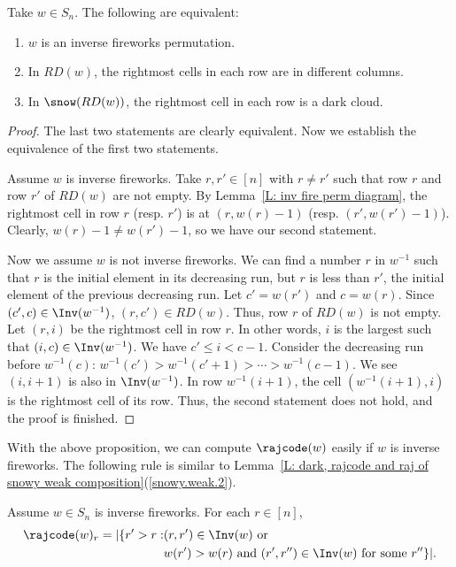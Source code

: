 \begin{prop}
Take $w \in S_n$.
The following are equivalent:
\begin{enumerate}
\item $w$ is an inverse fireworks permutation.
\item In $RD(w)$, the rightmost cells in each row 
are in different columns. 
\item In $\snow(RD(w))$, 
the rightmost cell in each row is a dark cloud. 
\end{enumerate}
\end{prop}
\begin{proof}
The last two statements are clearly equivalent. 
Now we establish the equivalence of 
the first two statements.

Assume $w$ is inverse fireworks.
Take $r, r' \in [n]$ with $r \neq r'$
such that row $r$ and row $r'$ of $RD(w)$
are not empty.
By Lemma~\ref{L: inv fire perm diagram},
the rightmost cell in row $r$ 
(resp. $r'$)
is at $(r, w(r) - 1)$ 
(resp. $(r', w(r') - 1)$).
Clearly, $w(r) - 1 \neq w(r') - 1$,
so we have our second statement. 

Now we assume $w$ is not inverse fireworks.
We can find a number $r$ in $w^{-1}$
such that $r$ is the initial element in
its decreasing run, 
but $r$ is less than $r'$, 
the initial element of the 
previous decreasing run. 
Let $c' = w(r')$ and $c = w(r)$.
Since $(c', c) \in \Inv(w^{-1})$, 
$(r, c') \in RD(w)$.
Thus, row $r$ of $RD(w)$ is not empty.
Let $(r, i)$ be the rightmost cell
in row $r$.
In other words, $i$ is the largest
such that $(i, c) \in \Inv(w^{-1})$.
We have $c' \leqslant i < c - 1$.
Consider the decreasing run before $w^{-1}(c)$:
$w^{-1}(c') > w^{-1}(c' + 1) > \cdots > w^{-1}(c - 1)$.
We see $(i, i+1)$ is also in $\Inv(w^{-1})$.
In row $w^{-1}(i+1)$, 
the cell $(w^{-1}(i+1), i)$ is the 
rightmost cell of its row.
Thus, the second statement does not hold,
and the proof is finished. 
\end{proof}

With the above proposition, we can compute $\rajcode(w)$ easily
if $w$ is inverse fireworks.
The following rule is similar to Lemma~\ref{L: dark, rajcode and raj of snowy weak composition}(\ref{snowy.weak.2}).

\begin{prop}
Assume $w \in S_n$ is inverse fireworks.
For each $r \in [n]$,
\begin{align*}
\rajcode(w)_r = |\{r' > r: &(r,r') \in \Inv(w) \textrm{ or }\\
&w(r') > w(r)\textrm{ and }(r', r'') \in \Inv(w) \textrm{ for some } r''\}|.
\end{align*}
\end{prop}

